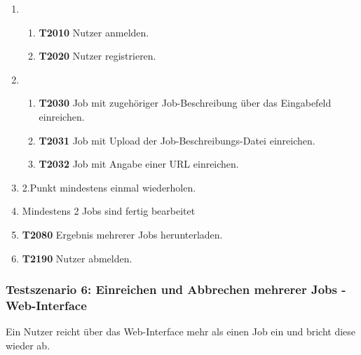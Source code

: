 \begin{enumerate}
     \item 
     \begin{enumerate}
        \item \textbf{T2010} Nutzer anmelden.
        
        \item \textbf{T2020} Nutzer registrieren.
     \end{enumerate}
     
     \item 
     \begin{enumerate}
        \item \textbf{T2030} Job mit zugehöriger Job-Beschreibung über das Eingabefeld einreichen.
        
        \item \textbf{T2031} Job mit Upload der Job-Beschreibungs-Datei einreichen.
        
        \item \textbf{T2032} Job mit Angabe einer URL einreichen.
     \end{enumerate}
     
     \item 2.Punkt mindestens einmal wiederholen.
     
     \item Mindestens 2 Jobs sind fertig bearbeitet
     
     \item \textbf{T2080} Ergebnis mehrerer Jobs herunterladen.
     
     \item \textbf{T2190} Nutzer abmelden.
\end{enumerate}

\subsubsection{Testszenario 6: Einreichen und Abbrechen mehrerer Jobs - Web-Interface}
Ein Nutzer reicht über das Web-Interface mehr als einen Job ein und bricht diese wieder ab.


